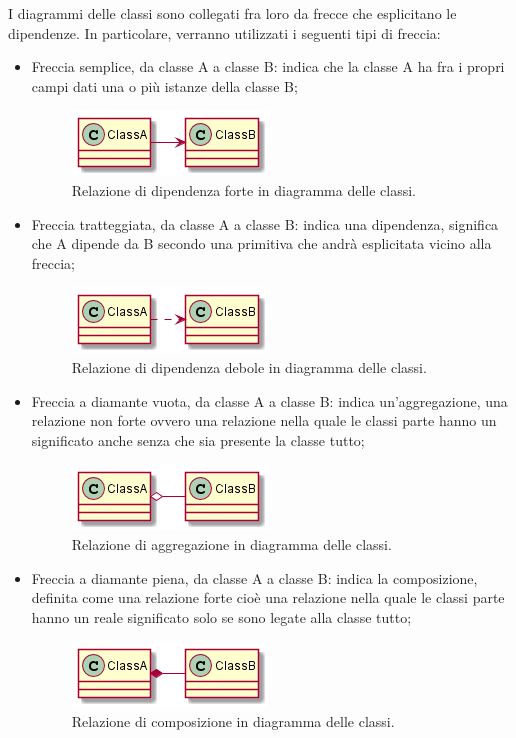 \documentclass[NormeDiProgetto.tex]{subfiles}
\begin{document}
I diagrammi delle classi sono collegati fra loro da frecce che esplicitano le dipendenze.
In particolare, verranno utilizzati i seguenti tipi di freccia:
\begin{itemize}
	\item Freccia semplice, da classe A a classe B: indica che la classe A ha fra i propri campi dati una o più istanze della classe B;
	\begin{figure}[H]
		\centering
		\includegraphics[width=0.4\linewidth]{progettazione/dip}
		\caption{Relazione di dipendenza forte in diagramma delle classi.}
		\label{fig:dip}
	\end{figure}
	\newpage
	\item Freccia tratteggiata, da classe A a classe B: indica una dipendenza, significa che A dipende da B secondo una primitiva che andrà esplicitata vicino alla freccia;
	\begin{figure}[H]
		\centering
		\includegraphics[width=0.4\linewidth]{progettazione/dipdebole}
		\caption{Relazione di dipendenza debole in diagramma delle classi.}
		\label{fig:dipdebole}
	\end{figure}
	
	\item Freccia a diamante vuota, da classe A a classe B: indica un'aggregazione, una relazione non forte ovvero una relazione nella quale le classi parte hanno un significato anche senza che sia presente la classe tutto;
	\begin{figure}[H]
		\centering
		\includegraphics[width=0.4\linewidth]{progettazione/aggreg}
		\caption{Relazione di aggregazione in diagramma delle classi.}
		\label{fig:aggreg}
	\end{figure}
	
	\item Freccia a diamante piena, da classe A a classe B: indica la composizione, definita come una relazione forte cioè una relazione nella quale le classi parte hanno un reale significato solo se sono legate alla classe tutto;
	\begin{figure}[H]
		\centering
		\includegraphics[width=0.4\linewidth]{progettazione/compos}
		\caption{Relazione di composizione in diagramma delle classi.}
		\label{fig:compos}
	\end{figure}
	

\end{itemize}
\end{document}
